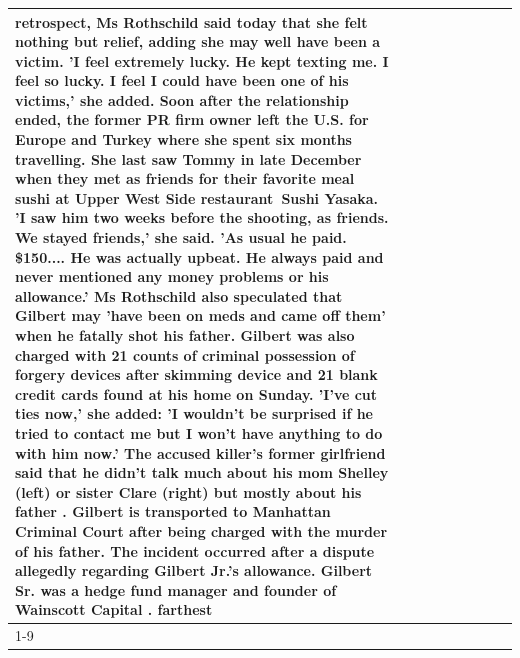 \begin{table}[H]
\begin{tabular}{lllrlllll}
retrospect, Ms Rothschild said today that she felt nothing but relief, adding she may well have been a victim. 'I feel extremely lucky. He kept texting me. I feel so lucky. I feel I could have been one of his victims,' she added. Soon after the relationship ended, the former PR firm owner left the U.S. for Europe and Turkey where she spent six months  travelling. She last saw Tommy in late December when they met as friends for their favorite meal sushi at Upper West Side restaurant Sushi Yasaka. 'I saw him two weeks before the shooting, as friends. We stayed friends,' she said. 'As usual he paid. \$150.... He was actually upbeat. He always paid and never mentioned any money problems or his allowance.' Ms Rothschild also speculated that Gilbert may 'have been on meds and came off them' when he fatally shot his father. Gilbert was also charged with 21 counts of criminal possession of forgery devices after skimming device and 21 blank credit cards found at his home on Sunday. 'I've cut ties now,' she added: 'I wouldn’t be surprised if he tried to contact me but I won’t have anything to do with him now.' The accused killer's former girlfriend said that he didn't talk much about his mom Shelley (left) or sister Clare (right) but mostly about his father . Gilbert is transported to Manhattan Criminal Court  after being charged with the murder of his father. The incident occurred after a dispute allegedly regarding Gilbert Jr.'s allowance. Gilbert Sr. was a hedge fund manager and founder of Wainscott Capital . farthest \\
\cline{1-9}

\end{tabular}
\end{table}
